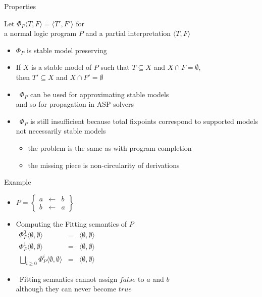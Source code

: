 \begin{frame}{Properties}

  Let $\Phi_P\langle T,F \rangle=\langle T',F'\rangle$
  for\\
  a normal logic program $P$ and
  a partial interpretation $\langle T,F \rangle$
  \smallskip
  \begin{itemize}
  \item<2-> $\Phi_P$ is \alert{stable model preserving}
  \item<2-> [] If $X$ is a stable model of $P$ such that $T\subseteq X$ and $X\cap F=\emptyset$,
    \\ then $T'\subseteq X$ and $X\cap F'=\emptyset$
    \smallskip
  \item<3->  \ $\Phi_P$ can be used for approximating stable models
    \\ and so for propagation in ASP solvers
    \medskip
  \item <4->   \ $\Phi_P$ is still insufficient because total fixpoints
    correspond to supported models not necessarily stable models
    \begin{itemize}\normalsize
    \item the problem is the same as with program completion
    \item the missing piece is non-circularity of derivations
    \end{itemize}
  \end{itemize}
\end{frame}
\begin{frame}{Example}
  \bigskip
  \begin{itemize}
  \item<1->
    \(
    P
    =
    \left\{
      \begin{array}{lcl}
        a &\leftarrow & b \\
        b &\leftarrow & a
      \end{array}
    \right\}
    \)
    \bigskip
  \item<2-> Computing the Fitting semantics of $P$
    \\
    \medskip
    \(
    \begin{array}{lcl}
      \Phi_P^0\langle \emptyset,\emptyset\rangle &=&\langle \emptyset,\emptyset\rangle\\
      \Phi_P^1\langle \emptyset,\emptyset\rangle &=&\langle \emptyset,\emptyset\rangle
      \\[5pt]
      \bigsqcup_{i \geq 0}\Phi_P^i\langle\emptyset,\emptyset\rangle&=&\langle\emptyset,\emptyset\rangle
    \end{array}
    \)
    \bigskip
  \item<3->  \
    Fitting semantics cannot assign $\mathit{false}$ to $a$ and $b$
    \\
    although they can never become $\mathit{true}$
  \end{itemize}
\end{frame}
